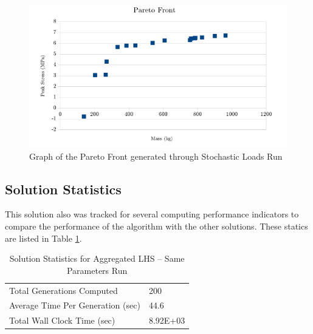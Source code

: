 \begin{figure}
\includegraphics[width=\textwidth]{img/s3i80g200_front.png}
\caption{Graph of the Pareto Front generated through Stochastic Loads Run}
\label{fig:pfront_sto}
\end{figure}

\subsection{Solution Statistics}
This solution also was tracked for several computing performance indicators to compare the performance of the algorithm with the other solutions. These statics are listed in Table \ref{tab:stat_sto}. 

\begin{table}[!htbp]
  \centering
  \begin{tabular}{|l|l|}
    \hline
	  Total Generations Computed & 200\\
    Average Time Per Generation (sec) & 44.6\\
    Total Wall Clock Time (sec)	 & 8.92E+03\\
    \hline
  \end{tabular}
  \caption{Solution Statistics for Aggregated LHS -- Same Parameters Run}
  \label{tab:stat_sto}
\end{table}
